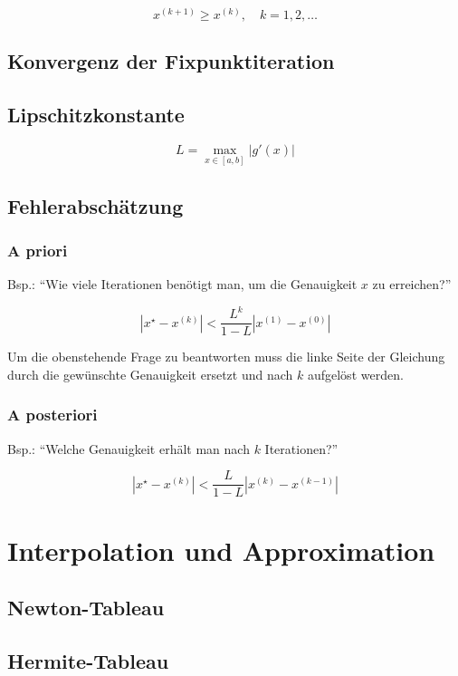 \documentclass[a4paper, twoside]{article}
\begin{document}
\[x^{(k+1)} \geq x^{(k)},\quad k = 1, 2, \ldots\]

\subsection{Konvergenz der Fixpunktiteration}

\subsection{Lipschitzkonstante}

\[L = \max_{x \in [a, b]} |g'(x)|\]

\subsection{Fehlerabschätzung}

\subsubsection{A priori}

Bsp.: \enquote{Wie viele Iterationen benötigt man, um die Genauigkeit \(x\) zu erreichen?}

\[\left|x^{\star} - x^{(k)}\right| < \frac{L^{k}}{1 -L} \left|x^{(1)} - x^{(0)}\right|\]

Um die obenstehende Frage zu beantworten muss die linke Seite der Gleichung durch die gewünschte Genauigkeit ersetzt und nach \(k\) aufgelöst werden.

\subsubsection{A posteriori}

Bsp.: \enquote{Welche Genauigkeit erhält man nach \(k\) Iterationen?}

\[\left|x^{\star} - x^{(k)}\right| < \frac{L}{1-L} \left|x^{(k)} - x^{(k-1)}\right|\]

\section{Interpolation und Approximation}

\subsection{Newton-Tableau}

\clearpage

\subsection{Hermite-Tableau}
\end{document}
